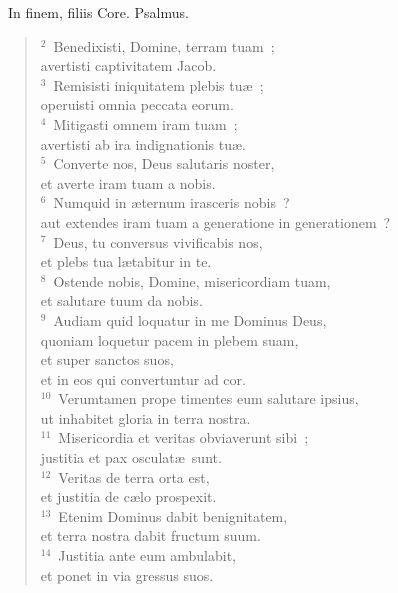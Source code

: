 ~\lettrine[lines=10,image=true,loversize=0.05,lraise=-0.03]{I}{}n finem, filiis Core. Psalmus.
\begin{flushleft}\begin{verse}\vspace{6pt}${}^{2}$~Benedixisti, Domine, terram tuam~;\\ avertisti captivitatem Jacob.\\
${}^{3}$~Remisisti iniquitatem plebis tu\ae~;\\ operuisti omnia peccata eorum.\\
${}^{4}$~Mitigasti omnem iram tuam~;\\ avertisti ab ira indignationis tu\ae .\\
${}^{5}$~Converte nos, Deus salutaris noster,\\ et averte iram tuam a nobis.\\
${}^{6}$~Numquid in \ae ternum irasceris nobis~?\\ aut extendes iram tuam a generatione in generationem~?\\
${}^{7}$~Deus, tu conversus vivificabis nos,\\ et plebs tua l\ae tabitur in te.\\
${}^{8}$~Ostende nobis, Domine, misericordiam tuam,\\ et salutare tuum da nobis.\\
${}^{9}$~Audiam quid loquatur in me Dominus Deus,\\ quoniam loquetur pacem in plebem suam,\\ et super sanctos suos,\\ et in eos qui convertuntur ad cor.\\
${}^{10}$~Verumtamen prope timentes eum salutare ipsius,\\ ut inhabitet gloria in terra nostra.\\
${}^{11}$~Misericordia et veritas obviaverunt sibi~;\\ justitia et pax osculat\ae\ sunt.\\
${}^{12}$~Veritas de terra orta est,\\ et justitia de c\ae lo prospexit.\\
${}^{13}$~Etenim Dominus dabit benignitatem,\\ et terra nostra dabit fructum suum.\\
${}^{14}$~Justitia ante eum ambulabit,\\ et ponet in via gressus suos.\end{verse}\end{flushleft}


